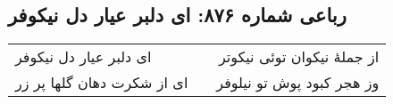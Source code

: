\begin{center}
\section*{رباعی شماره ۸۷۶: ای دلبر عیار دل نیکوفر}
\label{sec:0876}
\begin{longtable}{l p{0.5cm} r}
ای دلبر عیار دل نیکوفر
&&
از جملهٔ نیکوان توئی نیکوتر
\\
ای از شکرت دهان گلها پر زر
&&
وز هجر کبود پوش تو نیلوفر
\\
\end{longtable}
\end{center}
